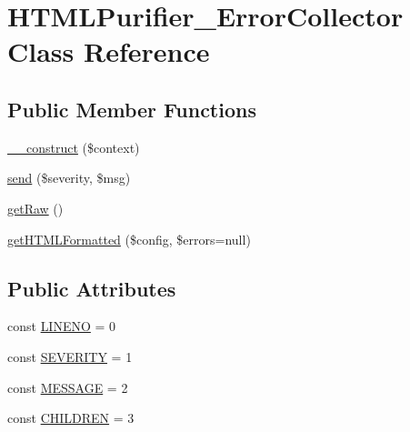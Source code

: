 \hypertarget{classHTMLPurifier__ErrorCollector}{\section{H\+T\+M\+L\+Purifier\+\_\+\+Error\+Collector Class Reference}
\label{classHTMLPurifier__ErrorCollector}
}
\subsection*{Public Member Functions}
\begin{DoxyCompactItemize}
\item 
\hyperlink{classHTMLPurifier__ErrorCollector_a2a93c5cadc58106d9d0cd01ea7295393}{\+\_\+\+\_\+construct} (\$context)
\item 
\hyperlink{classHTMLPurifier__ErrorCollector_a332a914b5d36ad58a9baaf447ca590b4}{send} (\$severity, \$msg)
\item 
\hyperlink{classHTMLPurifier__ErrorCollector_ae969e08cfe0a95f91f9afa87a49a727a}{get\+Raw} ()
\item 
\hyperlink{classHTMLPurifier__ErrorCollector_aabf3f9233ace5653eeebded99fe45d6a}{get\+H\+T\+M\+L\+Formatted} (\$config, \$errors=null)
\end{DoxyCompactItemize}
\subsection*{Public Attributes}
\begin{DoxyCompactItemize}
\item 
const \hyperlink{classHTMLPurifier__ErrorCollector_a9d60433c835cfa6d3a6f104387d91a38}{L\+I\+N\+E\+N\+O} = 0
\item 
const \hyperlink{classHTMLPurifier__ErrorCollector_a50e98b6911ff2b8e78b0c512aec72383}{S\+E\+V\+E\+R\+I\+T\+Y} = 1
\item 
const \hyperlink{classHTMLPurifier__ErrorCollector_a184c6bcec37b4fafbbeff5121da7a5c8}{M\+E\+S\+S\+A\+G\+E} = 2
\item 
const \hyperlink{classHTMLPurifier__ErrorCollector_a087e11859dcaab98d121f32ef279517d}{C\+H\+I\+L\+D\+R\+E\+N} = 3
\end{DoxyCompactItemize}
